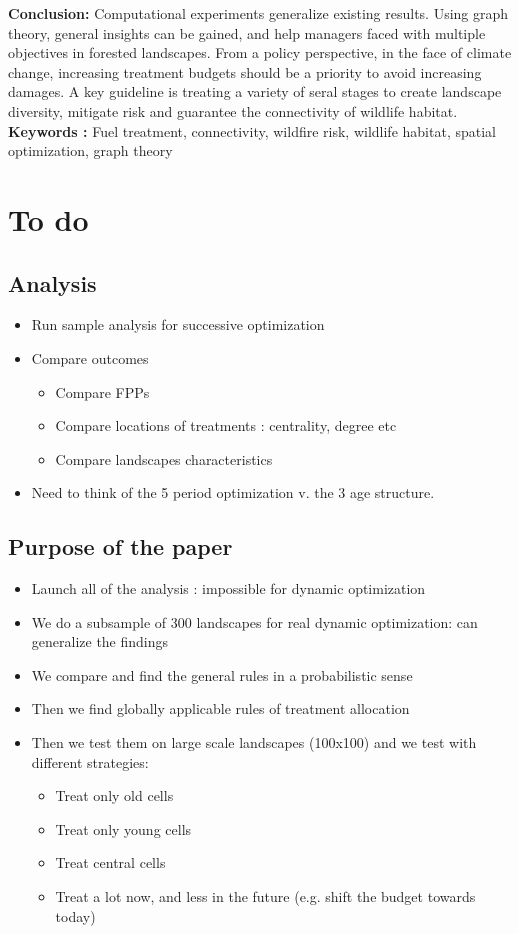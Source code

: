 \begin{center}
\begin{minipage}{0.9\textwidth}
 \textbf{Conclusion:} Computational experiments generalize existing results. Using graph theory, general insights can be gained, and help managers faced with multiple objectives in forested landscapes. From a policy perspective, in the face of climate change, increasing treatment budgets should be a priority to avoid increasing damages. A key guideline is treating a variety of seral stages to create landscape diversity, mitigate risk and guarantee the connectivity of wildlife habitat. 
\\
\textbf{Keywords : }Fuel treatment, connectivity, wildfire risk, wildlife habitat, spatial optimization, graph theory
\end{minipage}
\end{center}

\vfill
\newpage
\section*{To do}

\subsection*{Analysis}
\begin{itemize}
\item Run sample analysis for successive optimization
\item Compare outcomes
\begin{itemize}
\item Compare FPPs
\item Compare locations of treatments : centrality, degree etc
\item Compare landscapes characteristics
\end{itemize}
\item Need to think of the 5 period optimization v. the 3 age structure. 
\end{itemize}
\subsection*{Purpose of the paper}
\begin{itemize}
\item Launch all of the analysis : impossible for dynamic optimization
\item We do a subsample of 300 landscapes for real dynamic optimization: can generalize the findings 
\item We compare and find the general rules in a probabilistic sense
\item Then we find globally applicable rules of treatment allocation
\item Then we test them on large scale landscapes (100x100) and we test with different strategies: 
\begin{itemize}
\item Treat only old cells
\item Treat only young cells
\item Treat central cells
\item Treat a lot now, and less in the future (e.g. shift the budget towards today)
\end{itemize}
\end{itemize}

